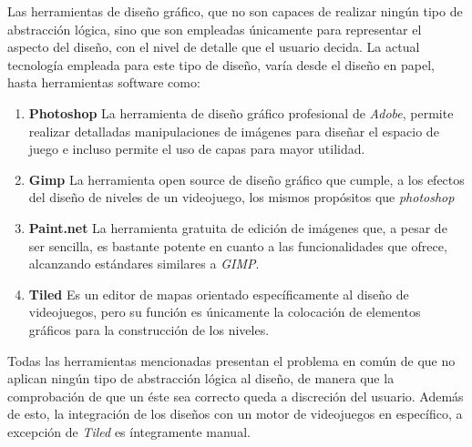 Las herramientas de diseño gráfico, que no son capaces de realizar ningún tipo de abstracción lógica, sino que son empleadas únicamente para representar el aspecto del diseño, con el nivel de detalle que el usuario decida.
La actual tecnología empleada para este tipo de diseño, varía desde el diseño en papel, hasta herramientas software como:
\begin{enumerate}
	\item \textbf{Photoshop\cite{photoshop}} La herramienta de diseño gráfico profesional de \textit{Adobe}, permite realizar detalladas manipulaciones de imágenes para diseñar el espacio de juego e incluso permite el uso de capas para mayor utilidad.
	\item \textbf{Gimp\cite{gimp}} La herramienta open source de diseño gráfico que cumple, a los efectos del diseño de niveles de un videojuego, los mismos propósitos que \textit{photoshop}
	\item \textbf{Paint.net\cite{paintdotnet}} La herramienta gratuita de edición de imágenes que, a pesar de ser sencilla, es bastante potente en cuanto a las funcionalidades que ofrece, alcanzando estándares similares a \textit{GIMP}.
	\item \textbf{Tiled\cite{tiled}} Es un editor de mapas orientado específicamente al diseño de videojuegos, pero su función es únicamente la colocación de elementos gráficos para la construcción de los niveles.
\end{enumerate}
Todas las herramientas mencionadas presentan el problema en común de que no aplican ningún tipo de abstracción lógica al diseño, de manera que la comprobación de que un éste sea correcto queda a discreción del usuario.
Además de esto, la integración de los diseños con un motor de videojuegos en específico, a excepción de \textit{Tiled\cite{tiled}} es íntegramente manual.